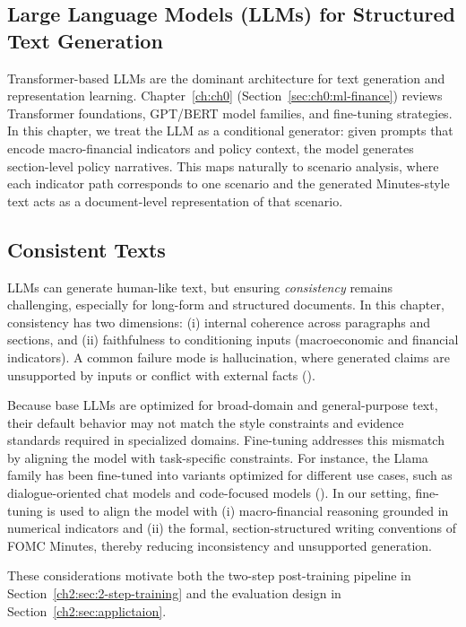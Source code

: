 \subsection*{Large Language Models (LLMs) for Structured Text Generation}\label{ch2:sec:lr:llm}


Transformer-based LLMs are the dominant architecture for text generation and representation learning. Chapter~\ref{ch:ch0} (Section~\ref{sec:ch0:ml-finance}) reviews Transformer foundations, GPT/BERT model families, and fine-tuning strategies. In this chapter, we treat the LLM as a conditional generator: given prompts that encode macro-financial indicators and policy context, the model generates section-level policy narratives. This maps naturally to scenario analysis, where each indicator path corresponds to one scenario and the generated Minutes-style text acts as a document-level representation of that scenario.


\subsection*{Consistent Texts}\label{ch2:sec:lr:text}


LLMs can generate human-like text, but ensuring \textit{consistency} remains challenging, especially for long-form and structured documents. In this chapter, consistency has two dimensions: (i) internal coherence across paragraphs and sections, and (ii) faithfulness to conditioning inputs (macroeconomic and financial indicators). A common failure mode is hallucination, where generated claims are unsupported by inputs or conflict with external facts (\cite{huang2025survey}).

Because base LLMs are optimized for broad-domain and general-purpose text, their default behavior may not match the style constraints and evidence standards required in specialized domains. Fine-tuning addresses this mismatch by aligning the model with task-specific constraints. For instance, the Llama family has been fine-tuned into variants optimized for different use cases, such as dialogue-oriented chat models and code-focused models (\cite{llama-recips}). In our setting, fine-tuning is used to align the model with (i) macro-financial reasoning grounded in numerical indicators and (ii) the formal, section-structured writing conventions of FOMC Minutes, thereby reducing inconsistency and unsupported generation.

These considerations motivate both the two-step post-training pipeline in Section~\ref{ch2:sec:2-step-training} and the evaluation design in Section~\ref{ch2:sec:applictaion}.

